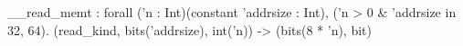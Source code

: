 __read_memt : forall ('n : Int)(constant 'addrsize : Int), ('n > 0 & 'addrsize in {32, 64}).
  (read_kind, bits('addrsize), int('n)) -> (bits(8 * 'n), bit)